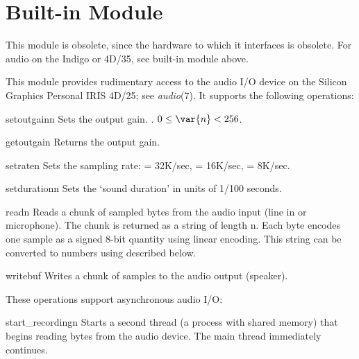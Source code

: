 \section{Built-in Module }
\label{module-audio}

 This module is obsolete, since the hardware to which it
interfaces is obsolete.  For audio on the Indigo or 4D/35, see
built-in module  above.

This module provides rudimentary access to the audio I/O device
 on the Silicon Graphics Personal IRIS 4D/25;
see {\it audio}(7). It supports the following operations:

\renewcommand{\indexsubitem}{(in module audio)}
\begin{funcdesc}{setoutgain}{n}
Sets the output gain.
\iftexi
{}.
\else
$0 \leq \var{n} < 256$.
\fi
\end{funcdesc}

\begin{funcdesc}{getoutgain}{}
Returns the output gain.
\end{funcdesc}

\begin{funcdesc}{setrate}{n}
Sets the sampling rate:  = 32K/sec,  = 16K/sec,
 = 8K/sec.
\end{funcdesc}

\begin{funcdesc}{setduration}{n}
Sets the `sound duration' in units of 1/100 seconds.
\end{funcdesc}

\begin{funcdesc}{read}{n}
Reads a chunk of
sampled bytes from the audio input (line in or microphone).
The chunk is returned as a string of length n.
Each byte encodes one sample as a signed 8-bit quantity using linear
encoding.
This string can be converted to numbers using  described
below.
\end{funcdesc}

\begin{funcdesc}{write}{buf}
Writes a chunk of samples to the audio output (speaker).
\end{funcdesc}

These operations support asynchronous audio I/O:

\renewcommand{\indexsubitem}{(in module audio)}
\begin{funcdesc}{start_recording}{n}
Starts a second thread (a process with shared memory) that begins reading
bytes from the audio device.
The main thread immediately continues.
\end{funcdesc}

